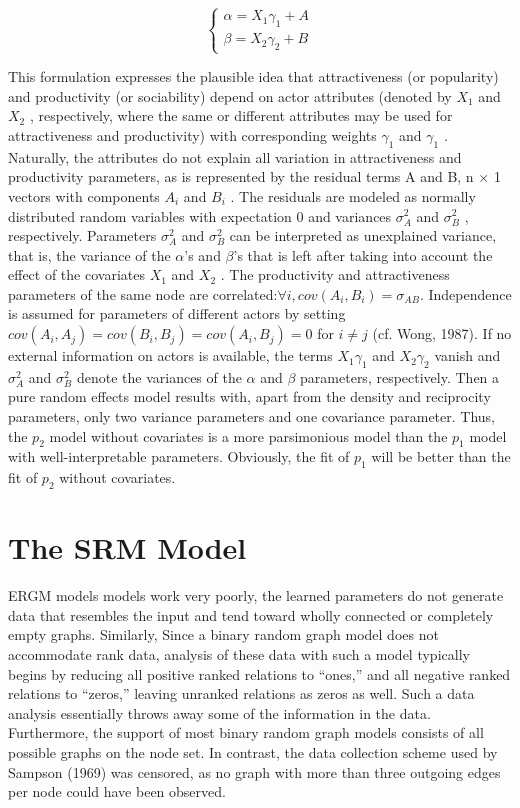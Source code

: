 \documentclass[12pt]{ociamthesis}  %
\begin{document}
	\begin{equation}
	\begin{cases}
	\alpha = X_{1} \gamma_{1} + A \\
	\beta = X_{2} \gamma_{2} + B
	\end{cases}
	\end{equation}

	This formulation expresses the plausible idea that attractiveness (or popularity) and productivity (or sociability) depend on actor attributes (denoted by $X_{1}$ and $X_{2}$ , respectively, where the same or different attributes may be used for attractiveness and productivity) with corresponding weights $\gamma_{1}$ and $\gamma_{1}$ . Naturally, the attributes do not explain all variation in attractiveness and productivity parameters, as is represented by the residual terms A and B, n $\times$ 1 vectors with components $A_{i}$ and $B_{i}$ . The residuals are modeled as normally distributed random variables with expectation 0 and variances $\sigma_{A}^{2}$ and $\sigma_{B}^{2}$ , respectively. Parameters $\sigma_{A}^{2}$ and $\sigma_{B}^{2}$ can be interpreted as unexplained variance, that is, the variance of the $\alpha$’s and $\beta$’s that is left after taking into account the effect of the covariates $X_{1}$ and $X_{2}$ . The productivity and attractiveness parameters of the same node
	are correlated:$\forall i,  cov(A_{i} , B_{i} ) = \sigma_{AB}$. Independence is assumed for parameters of different actors by setting $cov(A_{i} , A_{j} )=cov(B_{i} , B_{j} )=cov(A_{i} , B_{j} ) = 0$ for
	$i \neq j$ (cf. Wong, 1987).
	If no external information on actors is available, the terms $X_{1} \gamma_{1}$ and $X_{2} \gamma_{2}$ vanish and $\sigma_{A}^{2}$ and $\sigma_{B}^{2}$ denote the variances of the $\alpha$ and $\beta$ parameters, respectively. Then a pure random effects model results with, apart from the density and reciprocity parameters, only two variance parameters and one covariance parameter. Thus, the $p_{2}$ model without covariates is a more parsimonious model than the $p_{1}$ model with well-interpretable parameters. Obviously, the fit of $p_{1}$
	will be better than the fit of $p_{2}$ without covariates.
	
	
	\section{The SRM Model}
	
	ERGM models models work very poorly, the learned parameters do not generate data that resembles the input and tend toward wholly connected or completely empty graphs. Similarly, Since a binary random graph model does not accommodate rank data, analysis of these data with such a model typically begins by reducing all positive ranked relations to “ones,” and all negative ranked relations to “zeros,” leaving unranked relations as zeros as well. Such a data analysis essentially throws away some of the information in the data. Furthermore, the support of most binary random graph models consists of all possible graphs on the node set. In contrast, the data collection scheme used by Sampson (1969) was censored, as no graph with more than three outgoing edges per node could have been observed.
	
\end{document}
